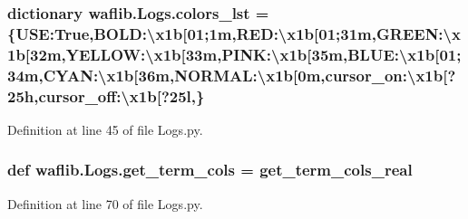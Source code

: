 \subsubsection[{\texorpdfstring{colors\+\_\+lst}{colors_lst}}]{\setlength{\rightskip}{0pt plus 5cm}dictionary waflib.\+Logs.\+colors\+\_\+lst = \{\textquotesingle{}U\+SE\textquotesingle{}\+:True,\textquotesingle{}B\+O\+LD\textquotesingle{}\+:\textquotesingle{}\textbackslash{}x1b\mbox{[}01;1m\textquotesingle{},\textquotesingle{}\+R\+E\+D\textquotesingle{}\+:\textquotesingle{}\textbackslash{}x1b\mbox{[}01;31m\textquotesingle{},\textquotesingle{}\+G\+R\+E\+E\+N\textquotesingle{}\+:\textquotesingle{}\textbackslash{}x1b\mbox{[}32m\textquotesingle{},\textquotesingle{}\+Y\+E\+L\+L\+O\+W\textquotesingle{}\+:\textquotesingle{}\textbackslash{}x1b\mbox{[}33m\textquotesingle{},\textquotesingle{}\+P\+I\+N\+K\textquotesingle{}\+:\textquotesingle{}\textbackslash{}x1b\mbox{[}35m\textquotesingle{},\textquotesingle{}\+B\+L\+U\+E\textquotesingle{}\+:\textquotesingle{}\textbackslash{}x1b\mbox{[}01;34m\textquotesingle{},\textquotesingle{}\+C\+Y\+A\+N\textquotesingle{}\+:\textquotesingle{}\textbackslash{}x1b\mbox{[}36m\textquotesingle{},\textquotesingle{}\+N\+O\+R\+M\+A\+L\textquotesingle{}\+:\textquotesingle{}\textbackslash{}x1b\mbox{[}0m\textquotesingle{},\textquotesingle{}cursor\+\_\+on\textquotesingle{}\+:\textquotesingle{}\textbackslash{}x1b\mbox{[}?25h\textquotesingle{},\textquotesingle{}cursor\+\_\+off\textquotesingle{}\+:\textquotesingle{}\textbackslash{}x1b\mbox{[}?25l\textquotesingle{},\}}\hypertarget{namespacewaflib_1_1_logs_a4b242b3dfbdd35156fe5fd7af371a775}{}\label{namespacewaflib_1_1_logs_a4b242b3dfbdd35156fe5fd7af371a775}


Definition at line 45 of file Logs.\+py.

\subsubsection[{\texorpdfstring{get\+\_\+term\+\_\+cols}{get_term_cols}}]{\setlength{\rightskip}{0pt plus 5cm}def waflib.\+Logs.\+get\+\_\+term\+\_\+cols = {\bf get\+\_\+term\+\_\+cols\+\_\+real}}\hypertarget{namespacewaflib_1_1_logs_a62cb596e9ae843fd7c62eecba1d34feb}{}\label{namespacewaflib_1_1_logs_a62cb596e9ae843fd7c62eecba1d34feb}


Definition at line 70 of file Logs.\+py.

